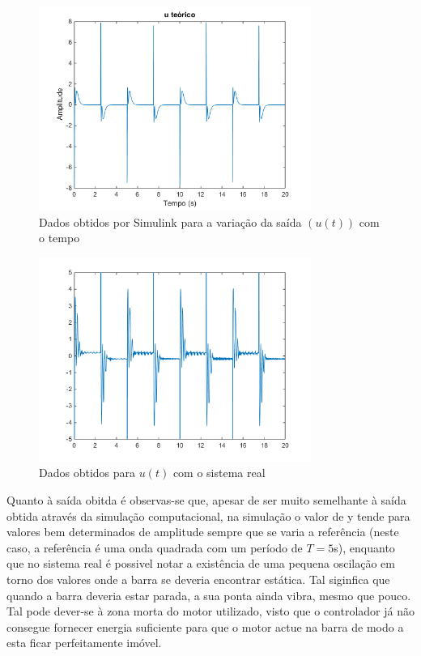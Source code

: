 \documentclass[%
  reprint,
  nofootinbib,
  amsmath,amssymb,
  aps,
  10pt,
  a4paper
]{revtex4-1}
\begin{document}
\begin{figure}
\includegraphics[width=3.5in]{../img/u.png}
\caption{Dados obtidos por Simulink para a variação da saída $(u(t))$ com o tempo}
\label{fig:u_t}
\end{figure}
\begin{figure}
\includegraphics[width=3.5in]{../img/u_dados_01.png}
\caption{Dados obtidos para $u(t)$ com o sistema real}
\label{fig:u_d}
\end{figure}
Quanto à saída obitda é observas-se que, apesar de ser muito semelhante à saída obtida através da simulação computacional, na simulação o valor de y tende para valores bem determinados de amplitude sempre que se varia a referência (neste caso, a referência é uma onda quadrada com um período de $T=5$s), enquanto que no sistema real é possivel notar a existência de uma pequena oscilação em torno dos valores onde a barra se deveria encontrar estática. Tal siginfica que quando a barra deveria estar parada, a sua ponta ainda vibra, mesmo que pouco. Tal pode dever-se à zona morta do motor utilizado, visto que o controlador já não consegue fornecer energia suficiente para que o motor actue na barra de modo a esta ficar perfeitamente imóvel.\\
\end{document}
